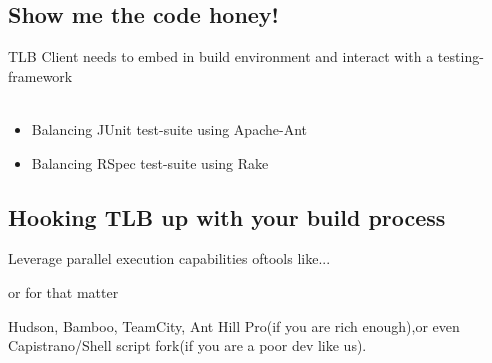 \documentclass{beamer}
\begin{document}
\subsection{Show me the code honey!}

\begin{frame}
  \begin{centering}
    {\small TLB Client needs to embed in build environment and interact with a testing-framework}
    \quad\\
    \quad\\
    \pause
    \begin{itemize}
    \item Balancing JUnit test-suite using Apache-Ant
      \pause
    \item Balancing RSpec test-suite using Rake
    \end{itemize}
  \end{centering}
\end{frame}

\subsection{Hooking TLB up with your build process}

\begin{frame}{Leverage parallel execution capabilities of}{tools like...}
  \begin{center}
  \end{center}
\end{frame}

\begin{frame}{or for that matter}
  \begin{center}
    {\huge Hudson, Bamboo, TeamCity, Ant Hill Pro}(if you are rich enough),{\huge or even Capistrano/Shell script fork}(if you are a poor dev like us).\\
  \end{center}
\end{frame}
\end{document}
